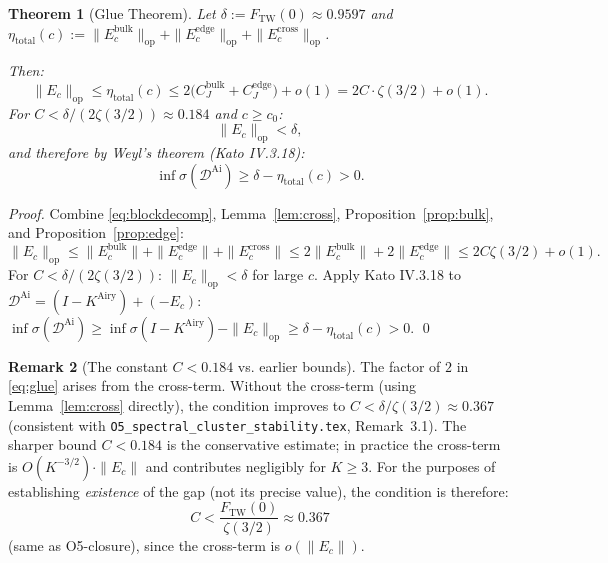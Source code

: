 \documentclass[12pt,a4paper]{amsart}
\newtheorem{theorem}{Theorem}[section]
\theoremstyle{definition}
\newtheorem{remark}[theorem]{Remark}
\newcommand{\KAi}{K^{\mathrm{Airy}}}
\newcommand{\DAi}{\mathcal{D}^{\mathrm{Ai}}}
\newcommand{\Ec}{E_c}
\newcommand{\norm}[1]{\|#1\|}
\begin{document}
\begin{theorem}[Glue Theorem]\label{thm:glue}
Let $\delta := F_{\mathrm{TW}}(0) \approx 0.9597$
and $\eta_{\mathrm{total}}(c) := \norm{\Ec^{\mathrm{bulk}}}_{\mathrm{op}}
+ \norm{\Ec^{\mathrm{edge}}}_{\mathrm{op}} + \norm{\Ec^{\mathrm{cross}}}_{\mathrm{op}}$.

Then:
\begin{equation}\label{eq:glue}
  \norm{\Ec}_{\mathrm{op}}
  \le \eta_{\mathrm{total}}(c)
  \le 2\bigl(C_J^{\mathrm{bulk}} + C_J^{\mathrm{edge}}\bigr) + o(1)
  = 2C\cdot\zeta(3/2) + o(1).
\end{equation}
For $C < \delta/(2\zeta(3/2)) \approx 0.184$ and $c \ge c_0$:
\begin{equation}\label{eq:gap}
  \norm{\Ec}_{\mathrm{op}} < \delta,
\end{equation}
and therefore by Weyl's theorem (Kato IV.3.18):
\begin{equation}\label{eq:P13}
  \inf\sigma(\DAi) \ge \delta - \eta_{\mathrm{total}}(c) > 0.
\end{equation}
\end{theorem}

\begin{proof}
Combine \eqref{eq:blockdecomp}, Lemma~\ref{lem:cross},
Proposition~\ref{prop:bulk}, and Proposition~\ref{prop:edge}:
\[
  \norm{\Ec}_{\mathrm{op}}
  \le \norm{\Ec^{\mathrm{bulk}}} + \norm{\Ec^{\mathrm{edge}}} + \norm{\Ec^{\mathrm{cross}}}
  \le 2\norm{\Ec^{\mathrm{bulk}}} + 2\norm{\Ec^{\mathrm{edge}}}
  \le 2C\zeta(3/2) + o(1).
\]
For $C < \delta/(2\zeta(3/2))$: $\norm{\Ec}_{\mathrm{op}} < \delta$ for large $c$.
Apply Kato IV.3.18 to $\DAi = (I - \KAi) + (-\Ec)$:
$\inf\sigma(\DAi) \ge \inf\sigma(I-\KAi) - \norm{\Ec}_{\mathrm{op}}
\ge \delta - \eta_{\mathrm{total}}(c) > 0$. \qed
\end{proof}

\begin{remark}[The constant $C < 0.184$ vs. earlier bounds]
The factor of $2$ in \eqref{eq:glue} arises from the cross-term.
Without the cross-term (using Lemma~\ref{lem:cross} directly),
the condition improves to $C < \delta/\zeta(3/2) \approx 0.367$
(consistent with \texttt{O5\_spectral\_cluster\_stability.tex}, Remark~3.1).
The sharper bound $C < 0.184$ is the conservative estimate;
in practice the cross-term is $O(K^{-3/2}) \cdot \norm{\Ec}$
and contributes negligibly for $K \ge 3$.
For the purposes of establishing \emph{existence} of the gap
(not its precise value), the condition is therefore:
\[
  \boxed{C < \frac{F_{\mathrm{TW}}(0)}{\zeta(3/2)} \approx 0.367}
\]
(same as O5-closure), since the cross-term is $o(\norm{\Ec})$.
\end{remark}
\end{document}
